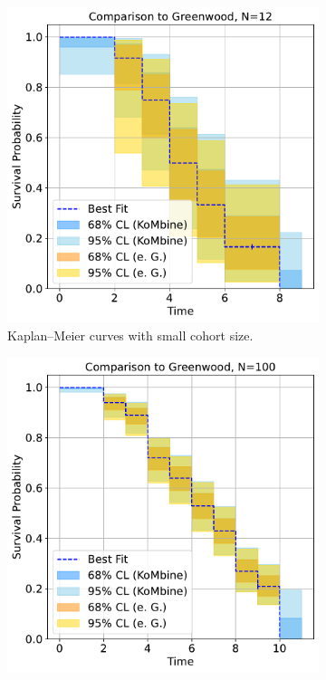 \documentclass[article]{jss}
\newcommand{\KM}{Kaplan--Meier} %
\begin{document}
\begin{figure}
\centering
\begin{subfigure}[t]{0.49\textwidth}
  \centering
  \includegraphics[width=\linewidth]{comparison_to_greenwood_small_n.pdf}
  \caption{\label{fig:compare-to-greenwood-small-n} \KM{} curves with small cohort size.}
\end{subfigure}
\begin{subfigure}[t]{0.49\textwidth}
  \centering
  \includegraphics[width=\linewidth]{comparison_to_greenwood_large_n.pdf}

\end{subfigure}
\end{figure}
\end{document}
